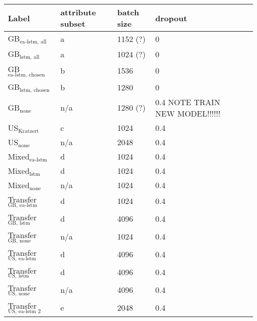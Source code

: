 \begin{tabular}{lllll}
    \toprule
    Label & attribute subset & batch size & dropout \\
    \midrule
    GB$_\text{ea-lstm, all}$ & a &  1152 (?)  & 0\\
    GB$_\text{lstm, all}$ & a & 1024 (?) & 0  \\
    GB$_\text{ea-lstm, chosen}$ & b & 1536 & 0 \\
    GB$_\text{lstm, chosen}$ & b & 1280 & 0\\
    GB$_\text{none}$ & n/a & 1280 (?) & 0.4 NOTE TRAIN NEW MODEL!!!!!!\\
    US$_\text{Kratzert}$  & c & 1024 & 0.4 \\
    US$_\text{none}$  & n/a & 2048 & 0.4\\
    Mixed$_\text{ea-lstm}$ & d & 1024 & 0.4\\
    Mixed$_\text{lstm}$ & d & 1024 & 0.4\\
    Mixed$_\text{none}$ & n/a & 1024 & 0.4\\
    Transfer$_\text{GB, ea-lstm}$ & d  & 1024 & 0.4 \\
    Transfer$_\text{GB, lstm}$ & d  & 4096 & 0.4\\
    Transfer$_\text{GB, none}$ & n/a & 1024 & 0.4 \\
    Transfer$_\text{US, ea-lstm}$ & d & 4096 & 0.4 \\
    Transfer$_\text{US, lstm}$  & d & 4096 & 0.4 \\ 
    Transfer$_\text{US, none}$  & n/a & 4096 & 0.4 \\
    Transfer$_\text{US, ea-lstm 2}$ & e & 2048 & 0.4 \\

\end{tabular}

